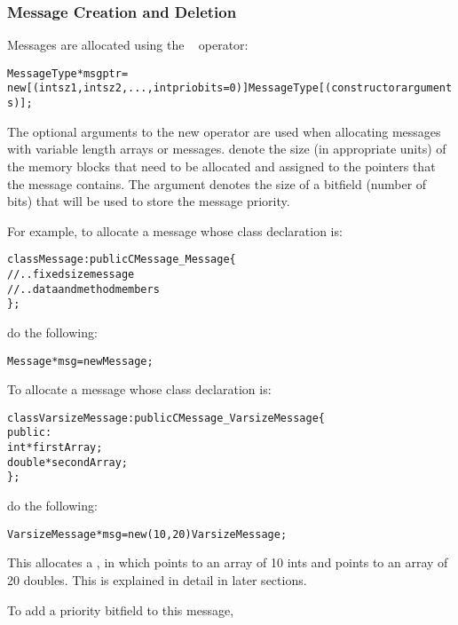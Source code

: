 \subsubsection{Message Creation and Deletion}

\label{memory allocation}

Messages are allocated using the \CC\  operator:

\begin{alltt}
 MessageType *msgptr =
  new [(int sz1, int sz2, ... , int priobits=0)] MessageType[(constructor arguments)];
\end{alltt}

The optional arguments to the new operator are used when allocating messages
with variable length arrays or  messages. 
denote the size (in appropriate units) of the memory blocks that need to be
allocated and assigned to the pointers that the message contains. The
 argument denotes the size of a bitfield (number of bits) that
will be used to store the message priority.   

For example, to allocate a message whose class declaration is:

\begin{alltt}
class Message : public CMessage_Message \{
  // .. fixed size message
  // .. data and method members
\};
\end{alltt}

do the following:

\begin{alltt}
Message *msg = new Message;
\end{alltt}

To allocate a message whose class declaration is:

\begin{alltt}
class VarsizeMessage : public CMessage_VarsizeMessage \{
 public:
  int *firstArray;
  double *secondArray;
\};
\end{alltt}

do the following:

\begin{alltt}
VarsizeMessage *msg = new (10, 20) VarsizeMessage;
\end{alltt}

This allocates a , in which  points to an
array of 10 ints and  points to an array of 20 doubles.  This
is explained in detail in later sections. 

To add a priority bitfield to this message, 

